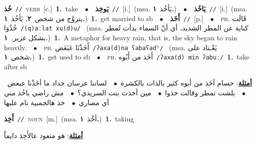 \documentclass[10pt,a4paper,twoside]{article} %
\begin{document}
\begin{multicols}{2}
{{{{{{\setlength\topsep{0pt}\textbf{\foreignlanguage{arabic}{خُذ}}\ {\color{gray}\texttt{//}\color{black}}\ \textsc{verb}\ [c.]\ \textbf{1.}~take\ \ $\bullet$\ \ \setlength\topsep{0pt}\textbf{\foreignlanguage{arabic}{يَوخِذ}}\ {\color{gray}\texttt{//}\color{black}}\ [i.]\ \color{gray}(msa. \foreignlanguage{arabic}{يَأخُذ}~\foreignlanguage{arabic}{\textbf{١.}})\color{black}\ \ $\bullet$\ \ \setlength\topsep{0pt}\textbf{\foreignlanguage{arabic}{يَاخُذ}}\ {\color{gray}\texttt{//}\color{black}}\ [i.]\ \color{gray}(msa. \foreignlanguage{arabic}{يتزوَّج من شخص}~\foreignlanguage{arabic}{\textbf{٢.}}  \foreignlanguage{arabic}{يَأخُذ}~\foreignlanguage{arabic}{\textbf{١.}})\color{black}\ \textbf{1.}~get married to sb\ \ $\bullet$\ \ \setlength\topsep{0pt}\textbf{\foreignlanguage{arabic}{أَخَذ}}\ {\color{gray}\texttt{//}\color{black}}\ [p.]\ \ $\bullet$\ \ \textsc{ph.} \color{gray} \foreignlanguage{arabic}{قَالَت خُذُوَا}\color{black}\ {\color{gray}\texttt{/{\sffamily (q)aːlat xu(d)u}/}\color{black}}\ \color{gray} (msa. \foreignlanguage{arabic}{كناية عن المطر الشديد، أي أنّ السماء بدأت تُمطر بشكل غزير.}~\foreignlanguage{arabic}{\textbf{١.}})\color{black}\ \textbf{1.}~A metaphor for heavy rain, that is, the sky began to rain heavily.\ \ $\bullet$\ \ \textsc{ph.} \color{gray} \foreignlanguage{arabic}{أَخَذْنَا عَبَعَض}\color{black}\ {\color{gray}\texttt{/{\sffamily ʔaxa(d)na ʕabaʕadˤ}/}\color{black}}\ \color{gray} (msa. \foreignlanguage{arabic}{يَعْـتاد على شخص}~\foreignlanguage{arabic}{\textbf{١.}})\color{black}\ \textbf{1.}~get used to sb\ \ $\bullet$\ \ \textsc{ph.} \color{gray} \foreignlanguage{arabic}{أَخَذ من أَبُوه}\color{black}\ {\color{gray}\texttt{/{\sffamily ʔaxa(d) min ʔabuː}/}\color{black}}\ \textbf{1.}~take after sb\  \begin{flushright}\color{gray}\foreignlanguage{arabic}{\textbf{\underline{\foreignlanguage{arabic}{أمثلة}}}: حسام أخَذ من أبوه كثير بالذات بالكشرة\ $\bullet$\ \  لساتنا عرسان جداد ما أخَذْنا عبعض\ $\bullet$\ \  بلشت تمطر وقالت خذوا\ $\bullet$\ \  مين أخذت بنت السريدي؟\ $\bullet$\ \  مش راضي ياخُذ مني أي مصاري\ $\bullet$\ \  خذ هالجمبية نام عليها}\end{flushright}\color{black}} \vspace{2mm}

{\setlength\topsep{0pt}\textbf{\foreignlanguage{arabic}{أَخِذ}}\ {\color{gray}\texttt{//}\color{black}}\ \textsc{noun}\ [m.]\ \color{gray}(msa. \foreignlanguage{arabic}{أخْذ}~\foreignlanguage{arabic}{\textbf{١.}})\color{black}\ \textbf{1.}~taking\  \begin{flushright}\color{gray}\foreignlanguage{arabic}{\textbf{\underline{\foreignlanguage{arabic}{أمثلة}}}: هو متعود عالأَخِذ دايماً}\end{flushright}\color{black}} \vspace{2mm}

}}}}}
\end{multicols}
\end{document}
